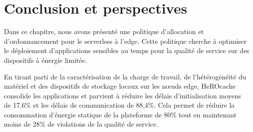 {%

\section{Conclusion et perspectives}
\label{section:herocache-conclusion}

Dans ce chapitre, nous avons présenté une politique d'allocation et d'ordonnancement pour le serverless à l'edge. Cette politique cherche à optimiser le déploiement d'applications sensibles au temps pour la qualité de service sur des dispositifs à énergie limitée.

En tirant parti de la caractérisation de la charge de travail, de l'hétérogénéité du matériel et des dispositifs de stockage locaux sur les nœuds edge, HeROcache consolide les applications et parvient à réduire les délais d'initialisation moyens de 17,6\% et les délais de communication de 88,4\%. Cela permet de réduire la consommation d'énergie statique de la plateforme de 80\% tout en maintenant moins de 28\% de violations de la qualité de service.

}
